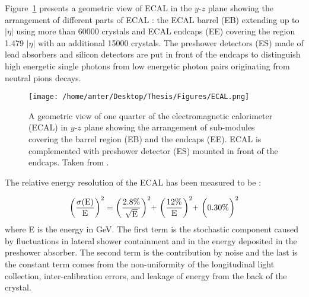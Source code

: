 Figure~\ref{fig:ecal} presents a geometric view of ECAL in the $y$-$z$ plane showing the arrangement of different parts of ECAL 
: the ECAL barrel (EB) extending up to $|\eta|$  using more than 60000 crystals and ECAL endcaps (EE) covering the region 1.479 \ls $|\eta|$  with an additional 15000 crystals. The preshower detectors (ES) made of lead absorbers and silicon detectors are put in front of the endcaps to distinguish high energetic single photons from low energetic photon pairs originating from neutral pions decays.

\begin{figure}[!h]
\begin{center}
\vspace*{3mm} 
\hspace*{-5mm}
\texttt{[image: /home/anter/Desktop/Thesis/Figures/ECAL.png]}\\
\vspace*{2mm}
\caption{A geometric view of one quarter of the electromagnetic calorimeter (ECAL) in $y$-$z$ plane showing the arrangement of sub-modules covering the barrel region (EB) and the endcaps (EE). ECAL is complemented with preshower detector (ES) mounted in front of the endcaps. Taken from \cite{Bayatian:2006nff}.}
\label{fig:ecal}
\end{center}
\end{figure}

The relative energy resolution of the ECAL has been measured to be \cite{Adzic:2007mi} :

\begin{equation}
{\rm \bigg(\frac{\sigma(E)}{E}\bigg)^2 = \bigg(\frac{2.8\%}{\sqrt{E}}\bigg)^2 \plus \bigg(\frac{12\%}{E}\bigg)^2 \plus \bigg(0.30\%\bigg)^2}
\end{equation}
where E is the energy in GeV. The first term is the stochastic component caused by fluctuations in lateral shower containment and in the energy deposited in the preshower absorber. The second term is the contribution by noise and the last is the constant term comes from the non-uniformity of the longitudinal light collection, inter-calibration errors, and leakage of energy from the back of the crystal.

